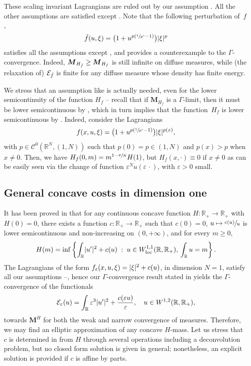 \documentclass[JEP,XML,SOM,Unicode,published]{cedram}
\theoremstyle{plain}
\theoremstyle{definition}
\newcommand{\R}{\mathbb{R}}
\newcommand{\Cspace}{\mathscr{C}}
\newcommand{\ener}{\mathcal{E}}
\newcommand{\mass}{\boldsymbol{M}}
\newcommand{\loc}{\mathrm{loc}}
\newcommand{\eps}{\varepsilon}
\newcommand{\st}{\;:\;}
\DeclarePairedDelimiter{\abs}{\lvert}{\rvert}
\begin{document}
These scaling invariant Lagrangians are ruled out by our assumption . All the other assumptions are satisfied except . Note that the following perturbation of~\(f\),
\[
\Tilde{f}(u,\xi)=\bigl(1+u^{p(\sfrac{1}{p^\star}-1)}\bigr)\abs{\xi}^p
\]
satisfies all the assumptions except , and provides a counterexample to the \(\Gamma\)\nobreakdash-con\-vergence. Indeed, \(\mass_{H_{\Tilde{f}}}\geq \mass_{H_f}\) is still infinite on diffuse measures, while (the relaxation of) \(\ener_{\Tilde{f}}\) is finite for any diffuse measure whose density has finite energy.

We stress that an assumption like  is actually needed, even for the lower semicontinuity of the function \(H_f\) -- recall that if \(\mass_{H_f}\) is a \(\Gamma\)-limit, then it must be lower semicontinuous by \cite[Prop.\,1.28]{braidesGammaConvergenceBeginners2002}, which in turn implies that the function~\(H_f\) is lower semicontinuous by . Indeed, consider the Lagrangians
\[
f(x,u,\xi)=\bigl(1+u^{p(\sfrac{1}{p^\star}-1)}\bigr)\abs{\xi}^{p(x)},
\]
with \(p\in\Cspace^0(\R^N,(1,N))\) such that \(p(0)=p\in (1,N)\) and \(p(x)>p\) when \(x\neq 0\). Then, we have \(H_f(0,m)=m^{1-\sfrac{p}{N}}H(1)\), but \(H_f(x,\cdot)\equiv 0\) if \(x\neq 0\) as can be easily seen via the change of function \(\eps^N u(\eps\,\cdot)\), with \(\eps>0\) small.

\subsection{General concave costs in dimension one}\label{generalCosts1d}

It has been proved in \cite{wirthPhaseFieldModels2019} that for any continuous concave function \(H:\R_+\to\R_+\) with \(H(0)=0\), there exists a function \(c:\R_+\to\R_+\) such that \(c(0)=0\), \(u\mapsto \sfrac{c(u)}{u}\) is lower semicontinuous and non-increasing on \((0,+\infty)\), and for every $m \geq 0$,
\[
H(m)=\inf\left\{\int_\R\abs{u'}^2+c(u)\st u\in W^{1,1}_\loc(\R,\R_+),\,\int_\R u=m\right\}.
\]
The Lagrangians of the form \(f_\eps(x,u,\xi)=\abs{\xi}^2+c(u)\), in dimension \(N=1\), satisfy all our assumptions --, hence our \(\Gamma\)-convergence result stated in  yields the \(\Gamma\)-convergence of the functionals
\[
\ener_\eps(u)=\int_\R\eps^3\abs{u'}^2+\frac{c(\eps u)}{\eps},\quad u\in W^{1,2}(\R,\R_+),
\]
towards \(\mass^{H}\) for both the weak and narrow convergence of measures. Therefore, we may find an elliptic approximation of any concave $H$-mass. Let us stress that $c$ is determined in \cite{wirthPhaseFieldModels2019} from $H$ through several operations including a deconvolution problem, but no closed form solution is given in general; nonetheless, an explicit solution is provided if $c$ is affine by parts.
\end{document}
